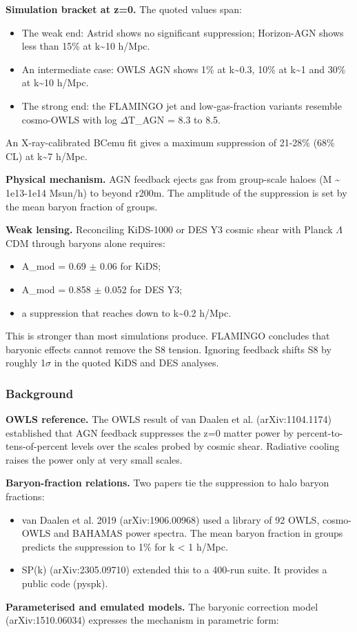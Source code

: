 \documentclass[11pt,a4paper]{article}
\begin{document}
\textbf{Simulation bracket at z=0.} The quoted values span:

\begin{itemize}
  \item The weak end: Astrid shows no significant suppression; Horizon-AGN shows less than 15\% at k\textasciitilde{}10 h/Mpc.
  \item An intermediate case: OWLS AGN shows 1\% at k\textasciitilde{}0.3, 10\% at k\textasciitilde{}1 and 30\% at k\textasciitilde{}10 h/Mpc.
  \item The strong end: the FLAMINGO jet and low-gas-fraction variants resemble cosmo-OWLS with log $\Delta$T\_AGN = 8.3 to 8.5.
\end{itemize}
An X-ray-calibrated BCemu fit gives a maximum suppression of 21-28\% (68\% CL) at k\textasciitilde{}7 h/Mpc.

\textbf{Physical mechanism.} AGN feedback ejects gas from group-scale haloes (M \textasciitilde{} 1e13-1e14 Msun/h) to beyond r200m. The amplitude of the suppression is set by the mean baryon fraction of groups.

\textbf{Weak lensing.} Reconciling KiDS-1000 or DES Y3 cosmic shear with Planck $\Lambda$CDM through baryons alone requires:

\begin{itemize}
  \item A\_mod = 0.69 $\pm$ 0.06 for KiDS;
  \item A\_mod = 0.858 $\pm$ 0.052 for DES Y3;
  \item a suppression that reaches down to k\textasciitilde{}0.2 h/Mpc.
\end{itemize}
This is stronger than most simulations produce. FLAMINGO concludes that baryonic effects cannot remove the S8 tension. Ignoring feedback shifts S8 by roughly 1$\sigma$ in the quoted KiDS and DES analyses.

\subsubsection*{Background}
\textbf{OWLS reference.} The OWLS result of van Daalen et al. (arXiv:1104.1174) established that AGN feedback suppresses the z=0 matter power by percent-to-tens-of-percent levels over the scales probed by cosmic shear. Radiative cooling raises the power only at very small scales.

\textbf{Baryon-fraction relations.} Two papers tie the suppression to halo baryon fractions:

\begin{itemize}
  \item van Daalen et al. 2019 (arXiv:1906.00968) used a library of 92 OWLS, cosmo-OWLS and BAHAMAS power spectra. The mean baryon fraction in groups predicts the suppression to 1\% for k \textless{} 1 h/Mpc.
  \item SP(k) (arXiv:2305.09710) extended this to a 400-run suite. It provides a public code (pyspk).
\end{itemize}
\textbf{Parameterised and emulated models.} The baryonic correction model (arXiv:1510.06034) expresses the mechanism in parametric form:
\end{document}
